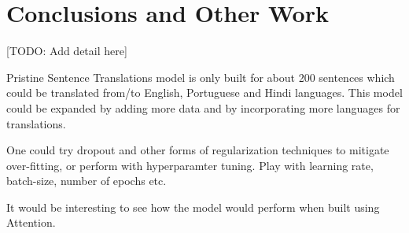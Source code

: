 \documentclass[runningheads]{llncs}
\begin{document}
	
	\section{Conclusions and Other Work}
	[TODO: Add detail here]
	
	Pristine Sentence Translations model is only built for about 200 sentences which could be translated from/to English, Portuguese and Hindi languages. This model could be expanded by adding more data and by incorporating more languages for translations.
	
	One could try dropout and other forms of regularization techniques to mitigate over-fitting, or perform with hyperparamter tuning. Play with learning rate, batch-size, number of epochs etc.
	
	It would be interesting to see how the model would perform when built using Attention.
	
\end{document}

